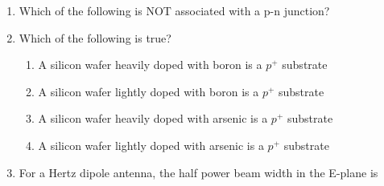 \documentclass[a4paper, 11pt]{article}
\begin{document}
\begin{enumerate}
    \hfill{}

    \item Which of the following is NOT associated with a p-n junction?
    
    \begin{enumerate}
    \end{enumerate}
    
    \hfill{}

    \item Which of the following is true?
    
    \begin{enumerate}
        \item A silicon wafer heavily doped with boron is a $p^+$ substrate
        \item A silicon wafer lightly doped with boron is a $p^+$ substrate
        \item A silicon wafer heavily doped with arsenic is a $p^+$ substrate
        \item A silicon wafer lightly doped with arsenic is a $p^+$ substrate
    \end{enumerate}

    \hfill{}

    \item For a Hertz dipole antenna, the half power beam width  in the E-plane is
    
    \begin{enumerate}
    \end{enumerate}
    
    \hfill{}


\end{enumerate}
\end{document}
